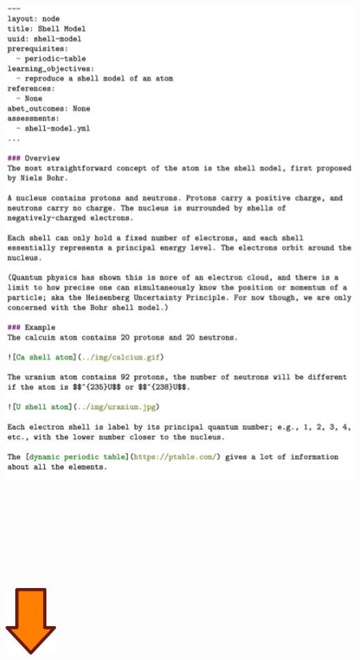 \documentclass[final]{beamer}
\newlength{\onecolwid}
\newlength{\threecolwid}
\begin{document}
\begin{frame}[t]
\begin{columns}[t,totalwidth=\threecolwid]
\begin{column}{\onecolwid}
                \centering
		\includegraphics[height=10in]{md-ex.png}

                \vspace{0.5in}
                \includegraphics[height=1in]{downarrow.png}


\end{column}
\end{columns}
\end{frame}
\end{document}
